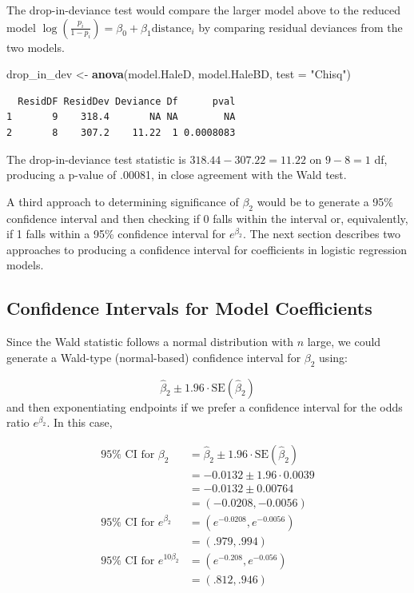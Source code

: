 \documentclass[
]{krantz}
\newenvironment{Shaded}{\begin{snugshade}}{\end{snugshade}}
\newcommand{\DataTypeTok}[1]{\textcolor[rgb]{0.27,0.27,0.27}{#1}}
\newcommand{\KeywordTok}[1]{\textcolor[rgb]{0.27,0.27,0.27}{\textbf{#1}}}
\newcommand{\NormalTok}[1]{#1}
\newcommand{\StringTok}[1]{\textcolor[rgb]{0.5,0.5,0.5}{#1}}
\begin{document}
The drop-in-deviance test would compare the larger model above to the reduced model \(\log\left(\frac{p_i}{1-p_i}\right) = \beta_0+\beta_1\textrm{distance}_i\) by comparing residual deviances from the two models.

\begin{Shaded}
\begin{Highlighting}[]
\NormalTok{drop_in_dev <-}\StringTok{ }\KeywordTok{anova}\NormalTok{(model.HaleD, model.HaleBD, }\DataTypeTok{test =} \StringTok{"Chisq"}\NormalTok{)}
\end{Highlighting}
\end{Shaded}

\begin{verbatim}
  ResidDF ResidDev Deviance Df      pval
1       9    318.4       NA NA        NA
2       8    307.2    11.22  1 0.0008083
\end{verbatim}

The drop-in-deviance test statistic is \(318.44 - 307.22 = 11.22\) on \(9 - 8 = 1\) df, producing a p-value of .00081, in close agreement with the Wald test.

A third approach to determining significance of \(\beta_2\) would be to generate a 95\% confidence interval and then checking if 0 falls within the interval or, equivalently, if 1 falls within a 95\% confidence interval for \(e^{\beta_2}.\) The next section describes two approaches to producing a confidence interval for coefficients in logistic regression models.

\hypertarget{confidence-intervals-for-model-coefficients}{%
\subsection{Confidence Intervals for Model Coefficients}\label{confidence-intervals-for-model-coefficients}}

Since the Wald statistic follows a normal distribution with \(n\) large, we could generate a Wald-type (normal-based) confidence interval  for \(\beta_2\) using:

\[\hat\beta_2 \pm 1.96\cdot\textrm{SE}(\hat\beta_2)\]
and then exponentiating endpoints if we prefer a confidence interval for the odds ratio \(e^{\beta_2}\). In this case,

\begin{align*}
95\% \textrm{ CI for } \beta_2 &= \hat{\beta}_2 \pm 1.96 \cdot \textrm{SE}(\hat{\beta}_2) \\
                               &= -0.0132 \pm 1.96 \cdot 0.0039 \\
                               &= -0.0132 \pm 0.00764 \\
                               &= (-0.0208, -0.0056) \\
95\% \textrm{ CI for } e^{\beta_2} &= (e^{-0.0208}, e^{-0.0056}) \\
                                   &= (.979, .994) \\
95\% \textrm{ CI for } e^{10\beta_2} &= (e^{-0.208}, e^{-0.056}) \\
                                      &= (.812, .946)
\end{align*}
\end{document}
